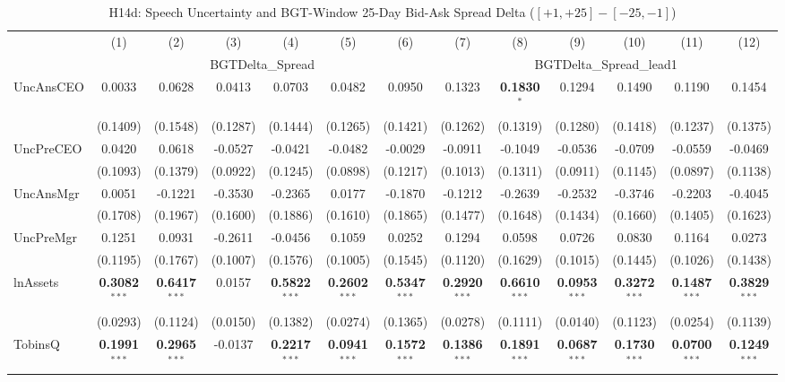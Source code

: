 \documentclass[11pt,a4paper]{article}
\begin{document}
\begin{table}[htbp]
\centering
\caption{H14d: Speech Uncertainty and BGT-Window 25-Day Bid-Ask Spread Delta ($[+1,+25]-[-25,-1]$)}
\label{tab:h14d}
\scriptsize
\begin{tabular}{lcccccccccccc}
\toprule
 & (1) & (2) & (3) & (4) & (5) & (6) & (7) & (8) & (9) & (10) & (11) & (12) \\
 & \multicolumn{6}{c}{BGTDelta\_Spread} & \multicolumn{6}{c}{BGTDelta\_Spread\_lead1} \\
\cmidrule(lr){2-7} \cmidrule(lr){8-13}
\midrule
UncAnsCEO & 0.0033 & 0.0628 & 0.0413 & 0.0703 & 0.0482 & 0.0950 & 0.1323 & \textbf{0.1830}$^{*}$ & 0.1294 & 0.1490 & 0.1190 & 0.1454 \\
 & (0.1409) & (0.1548) & (0.1287) & (0.1444) & (0.1265) & (0.1421) & (0.1262) & (0.1319) & (0.1280) & (0.1418) & (0.1237) & (0.1375) \\
UncPreCEO & 0.0420 & 0.0618 & -0.0527 & -0.0421 & -0.0482 & -0.0029 & -0.0911 & -0.1049 & -0.0536 & -0.0709 & -0.0559 & -0.0469 \\
 & (0.1093) & (0.1379) & (0.0922) & (0.1245) & (0.0898) & (0.1217) & (0.1013) & (0.1311) & (0.0911) & (0.1145) & (0.0897) & (0.1138) \\
UncAnsMgr & 0.0051 & -0.1221 & -0.3530 & -0.2365 & 0.0177 & -0.1870 & -0.1212 & -0.2639 & -0.2532 & -0.3746 & -0.2203 & -0.4045 \\
 & (0.1708) & (0.1967) & (0.1600) & (0.1886) & (0.1610) & (0.1865) & (0.1477) & (0.1648) & (0.1434) & (0.1660) & (0.1405) & (0.1623) \\
UncPreMgr & 0.1251 & 0.0931 & -0.2611 & -0.0456 & 0.1059 & 0.0252 & 0.1294 & 0.0598 & 0.0726 & 0.0830 & 0.1164 & 0.0273 \\
 & (0.1195) & (0.1767) & (0.1007) & (0.1576) & (0.1005) & (0.1545) & (0.1120) & (0.1629) & (0.1015) & (0.1445) & (0.1026) & (0.1438) \\
\midrule
lnAssets & \textbf{0.3082}$^{***}$ & \textbf{0.6417}$^{***}$ & 0.0157 & \textbf{0.5822}$^{***}$ & \textbf{0.2602}$^{***}$ & \textbf{0.5347}$^{***}$ & \textbf{0.2920}$^{***}$ & \textbf{0.6610}$^{***}$ & \textbf{0.0953}$^{***}$ & \textbf{0.3272}$^{***}$ & \textbf{0.1487}$^{***}$ & \textbf{0.3829}$^{***}$ \\
 & (0.0293) & (0.1124) & (0.0150) & (0.1382) & (0.0274) & (0.1365) & (0.0278) & (0.1111) & (0.0140) & (0.1123) & (0.0254) & (0.1139) \\
TobinsQ & \textbf{0.1991}$^{***}$ & \textbf{0.2965}$^{***}$ & -0.0137 & \textbf{0.2217}$^{***}$ & \textbf{0.0941}$^{***}$ & \textbf{0.1572}$^{***}$ & \textbf{0.1386}$^{***}$ & \textbf{0.1891}$^{***}$ & \textbf{0.0687}$^{***}$ & \textbf{0.1730}$^{***}$ & \textbf{0.0700}$^{***}$ & \textbf{0.1249}$^{***}$ \\

\end{tabular}
\end{table}
\end{document}
